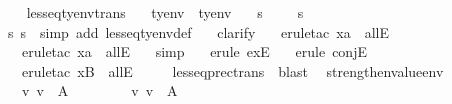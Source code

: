 \begin{isabellebody}
\ \ \isamarkupfalse \endisatagproof
{\isafoldproof}\isadelimproof
\isanewline
\endisadelimproof
\isanewline
{}\isamarkupfalse \ lesseq{\isacharunderscore}tyenv{\isacharunderscore}trans{\isacharcolon}\isanewline
\ \ \ {\isasymSigma}{\isacharcolon}{\isacharcolon}ty{\isacharunderscore}env\ \ {\isasymSigma}{\isacharprime}{\isacharcolon}{\isacharcolon}ty{\isacharunderscore}env\isanewline
\ \ \ s{}{}{\isacharcolon}\ {\isachardoublequoteopen}{\isasymSigma}{\isacharprime}\ {\isasymsqsubseteq}\ {\isasymSigma}{\isacharprime}{\isacharprime}{\isachardoublequoteclose}\ \ s{}{}{\isacharcolon}\ {\isachardoublequoteopen}{\isasymSigma}\ {\isasymsqsubseteq}\ {\isasymSigma}{\isacharprime}{\isachardoublequoteclose}\ \isanewline
\ \ \ {\isachardoublequoteopen}{\isasymSigma}\ {\isasymsqsubseteq}\ {\isasymSigma}{\isacharprime}{\isacharprime}{\isachardoublequoteclose}\isanewline
\isadelimproof
\ \ \endisadelimproof
\isatagproof
{}\isamarkupfalse \ s{}{}\ s{}{}\ \isamarkupfalse \ {\isacharparenleft}simp\ add{\isacharcolon}\ lesseq{\isacharunderscore}tyenv{\isacharunderscore}def{\isacharparenright}\isanewline
\ \ \isamarkupfalse \ clarify\isanewline
\ \ \isamarkupfalse \ {\isacharparenleft}erule{\isacharunderscore}tac\ x{\isacharequal}a\ \ allE{\isacharparenright}\isanewline
\ \ \isamarkupfalse \ {\isacharparenleft}erule{\isacharunderscore}tac\ x{\isacharequal}a\ \ allE{\isacharparenright}\isanewline
\ \ \isamarkupfalse \ simp\isanewline
\ \ \isamarkupfalse \ {\isacharparenleft}erule\ exE{\isacharparenright}\isanewline
\ \ \isamarkupfalse \ {\isacharparenleft}erule\ conjE{\isacharparenright}\isanewline
\ \ \isamarkupfalse \ {\isacharparenleft}erule{\isacharunderscore}tac\ x{\isacharequal}B\ \ allE{\isacharparenright}\ \ \isanewline
\ \ \isamarkupfalse \ lesseq{\isacharunderscore}prec{\isacharunderscore}trans\ \isamarkupfalse \ blast\ \isamarkupfalse \endisatagproof
{\isafoldproof}\isadelimproof
\isanewline
\endisadelimproof
\isanewline
{}\isamarkupfalse \ strengthen{\isacharunderscore}value{\isacharunderscore}env{\isacharcolon}\isanewline
\ \ {\isachardoublequoteopen}{\isacharparenleft}{\isasymSigma}\ {\isasymturnstile}v\ v\ {\isacharcolon}\ A\ {\isasymlongrightarrow}\ {\isacharparenleft}{\isasymforall}\ {\isasymSigma}{\isacharprime}{\isachardot}\ {\isasymSigma}{\isacharprime}\ {\isasymsqsubseteq}\ {\isasymSigma}\ {\isasymlongrightarrow}\ {\isasymSigma}{\isacharprime}\ {\isasymturnstile}v\ v\ {\isacharcolon}\ A{\isacharparenright}{\isacharparenright}\isanewline

\end{isabellebody}
